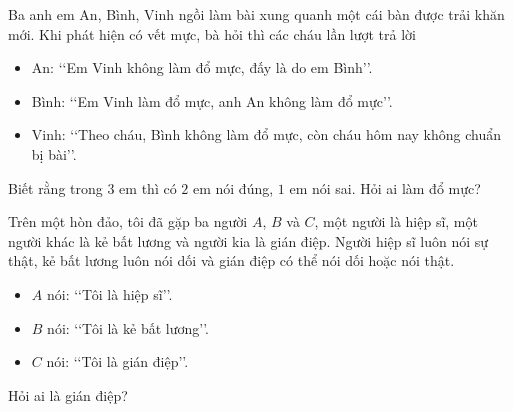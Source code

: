 \begin{bt}%
	Ba anh em An, Bình, Vinh ngồi làm  bài xung quanh một cái bàn được trải khăn mới. Khi phát hiện có vết mực, bà hỏi thì các cháu lần lượt trả lời
	\begin{itemize}
		\item An: \lq \lq Em Vinh không làm đổ mực,  đấy là do em Bình\rq \rq.
		\item Bình: \lq \lq  Em Vinh làm đổ mực, anh An không làm đổ mực\rq \rq.
		\item Vinh: \lq \lq Theo cháu, Bình không làm đổ mực,  còn cháu hôm nay không chuẩn bị bài\rq \rq.
	\end{itemize}
	Biết rằng trong $3$ em thì có $2$ em nói đúng, $1$ em nói  sai. Hỏi ai làm đổ mực?
\end{bt}

\begin{bt}%
	Trên một hòn đảo, tôi đã gặp ba người $A$, $B$ và $C$, một người là hiệp sĩ, một người khác là kẻ bất lương và người kia là gián điệp. Người hiệp sĩ luôn nói sự thật, kẻ bất lương luôn nói dối và gián điệp có thể nói dối hoặc  nói thật.
	\begin{itemize}
		\item $A$  nói: \lq\lq Tôi là hiệp sĩ\rq\rq.
		\item $B$ nói: \lq\lq Tôi là kẻ  bất lương\rq\rq.
		\item $C$ nói: \lq\lq Tôi là gián  điệp\rq\rq.
	\end{itemize}
	Hỏi ai  là gián điệp?
\end{bt}

